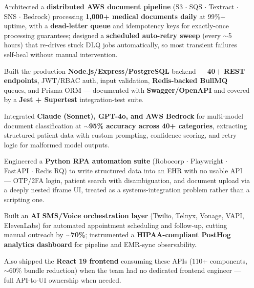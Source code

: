 \documentclass[a4paper,10pt]{article}
\begin{document}
\vspace{2pt}
\begin{itemize}[leftmargin=0.15in, itemsep=1pt]
    \small{\item
    Architected a \textbf{distributed AWS document pipeline} (S3 $\cdot$ SQS $\cdot$ Textract $\cdot$ SNS $\cdot$ Bedrock) processing \textbf{1,000+ medical documents daily} at 99\%+ uptime, with a \textbf{dead-letter queue} and idempotency keys for exactly-once processing guarantees; designed a \textbf{scheduled auto-retry sweep} (every $\sim$5 hours) that re-drives stuck DLQ jobs automatically, so most transient failures self-heal without manual intervention.
    }

    \small{\item
    Built the production \textbf{Node.js/Express/PostgreSQL} backend --- \textbf{40+ REST endpoints}, JWT/RBAC auth, input validation, \textbf{Redis-backed BullMQ} queues, and Prisma ORM --- documented with \textbf{Swagger/OpenAPI} and covered by a \textbf{Jest + Supertest} integration-test suite.
    }

    \small{\item
    Integrated \textbf{Claude (Sonnet), GPT-4o, and AWS Bedrock} for multi-model document classification at \textbf{$\sim$95\% accuracy across 40+ categories}, extracting structured patient data with custom prompting, confidence scoring, and retry logic for malformed model outputs.
    }

    \small{\item
    Engineered a \textbf{Python RPA automation suite} (Robocorp $\cdot$ Playwright $\cdot$ FastAPI $\cdot$ Redis RQ) to write structured data into an EHR with no usable API --- OTP/2FA login, patient search with disambiguation, and document upload via a deeply nested iframe UI, treated as a systems-integration problem rather than a scripting one.
    }

    \small{\item
    Built an \textbf{AI SMS/Voice orchestration layer} (Twilio, Telnyx, Vonage, VAPI, ElevenLabs) for automated appointment scheduling and follow-up, cutting manual outreach by $\sim$\textbf{70\%}; instrumented a \textbf{HIPAA-compliant PostHog analytics dashboard} for pipeline and EMR-sync observability.
    }

    \small{\item
    Also shipped the \textbf{React 19 frontend} consuming these APIs (110+ components, $\sim$60\% bundle reduction) when the team had no dedicated frontend engineer --- full API-to-UI ownership when needed.
    }
\end{itemize}
\end{document}
